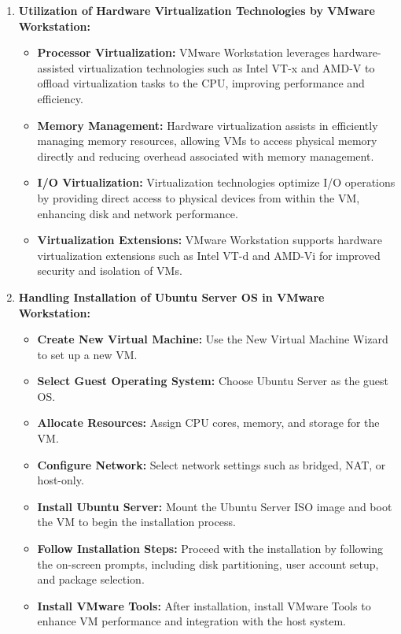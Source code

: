\documentclass[11pt]{article}
\begin{document}
\begin{enumerate}
    \item \textbf{Utilization of Hardware Virtualization Technologies by VMware Workstation:}
          \begin{itemize}
              \item \textbf{Processor Virtualization:} VMware Workstation leverages hardware-assisted virtualization technologies such as Intel VT-x and AMD-V to offload virtualization tasks to the CPU, improving performance and efficiency.
              \item \textbf{Memory Management:} Hardware virtualization assists in efficiently managing memory resources, allowing VMs to access physical memory directly and reducing overhead associated with memory management.
              \item \textbf{I/O Virtualization:} Virtualization technologies optimize I/O operations by providing direct access to physical devices from within the VM, enhancing disk and network performance.
              \item \textbf{Virtualization Extensions:} VMware Workstation supports hardware virtualization extensions such as Intel VT-d and AMD-Vi for improved security and isolation of VMs.
          \end{itemize}

    \item \textbf{Handling Installation of Ubuntu Server OS in VMware Workstation:}
          \begin{itemize}
              \item \textbf{Create New Virtual Machine:} Use the New Virtual Machine Wizard to set up a new VM.
              \item \textbf{Select Guest Operating System:} Choose Ubuntu Server as the guest OS.
              \item \textbf{Allocate Resources:} Assign CPU cores, memory, and storage for the VM.
              \item \textbf{Configure Network:} Select network settings such as bridged, NAT, or host-only.
              \item \textbf{Install Ubuntu Server:} Mount the Ubuntu Server ISO image and boot the VM to begin the installation process.
              \item \textbf{Follow Installation Steps:} Proceed with the installation by following the on-screen prompts, including disk partitioning, user account setup, and package selection.
              \item \textbf{Install VMware Tools:} After installation, install VMware Tools to enhance VM performance and integration with the host system.
          \end{itemize}
\end{enumerate}
\end{document}
